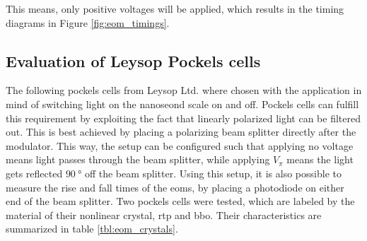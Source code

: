 This means, only positive voltages will be applied, which results in the timing diagrams in Figure \ref{fig:eom_timings}.

\begin{figure}[h]
\end{figure}

\begin{figure}[h]
\end{figure}

\subsection{Evaluation of Leysop Pockels cells}

The following pockels cells from Leysop Ltd. where chosen with the application in mind of switching light on the nanoseond scale on and off. Pockels cells can fulfill this requirement by exploiting the fact that linearly polarized light can be filtered out. This is best achieved by placing a polarizing beam splitter directly after the modulator. This way, the setup can be configured such that applying no voltage means light passes through the beam splitter, while applying $V_\pi$ means the light gets reflected $\SI{90}{\degree}$ off the beam splitter. 
Using this setup, it is also possible to measure the rise and fall times of the \acp{eom}, by placing a photodiode on either end of the beam splitter. Two  pockels cells were tested, which are labeled by the material of their nonlinear crystal, \ac{rtp} and \ac{bbo}. Their characteristics are summarized in table \ref{tbl:eom_crystals}.

